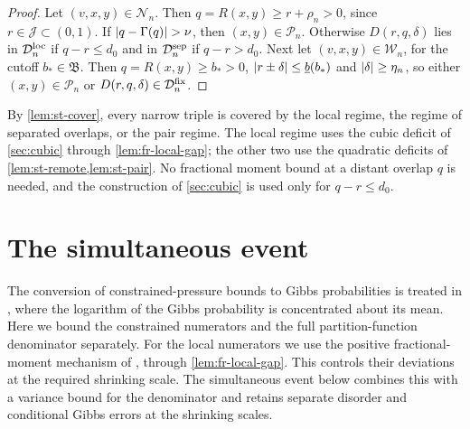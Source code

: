 \begin{proof}
Let $(v,x,y)\in\mathcal N_n$. Then $q=R(x,y)\ge r+\rho_n>0$, since $r\in\mathcal J\subset(0,1)$. If $\lvert q-\Gamma(q)\rvert>\nu$, then $(x,y)\in\mathcal P_n$. Otherwise $D(r,q,\delta)$ lies in $\mathcal D^{\rm loc}_n$ if $q-r\le d_0$ and in $\mathcal D^{\rm sep}_n$ if $q-r>d_0$. Next let $(v,x,y)\in\mathcal W_n$, for the cutoff $b_*\in\mathfrak B$. Then $q=R(x,y)\ge b_*>0$, $\lvert r\pm\delta\rvert\le\underline b(b_*)$ and $\lvert \delta\rvert\ge\eta_n$, so either $(x,y)\in\mathcal P_n$ or $D(r,q,\delta)\in\mathcal D^{\rm fix}_n$.
\end{proof}

By \cref{lem:st-cover}, every narrow triple is covered by the local regime, the regime of separated overlaps, or the pair regime. The local regime uses the cubic deficit of \cref{sec:cubic} through \cref{lem:fr-local-gap}; the other two use the quadratic deficits of \cref{lem:st-remote,lem:st-pair}. No fractional moment bound at a distant overlap $q$ is needed, and the construction of \cref{sec:cubic} is used only for $q-r\le d_0$.

\section{The simultaneous event}\label{sec:st-event}

The conversion of constrained-pressure bounds to Gibbs probabilities is
treated in \cite[Lemma~4.2]{oai-barriers}, where the logarithm of the Gibbs
probability is concentrated about its mean. Here we bound the constrained
numerators and the full partition-function denominator separately.
For the local numerators we use the positive fractional-moment mechanism of
\cite[Section~2.3]{quantitative-parisi}, through \cref{lem:fr-local-gap}. This
controls their deviations at the required shrinking scale. The simultaneous event
below combines this with a variance bound for the denominator and retains
separate disorder and conditional Gibbs errors at the shrinking scales.

